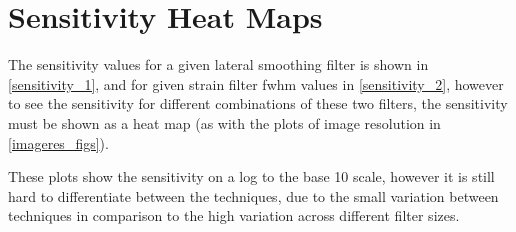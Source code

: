 \chapter{Sensitivity Heat Maps}\label{sensitivity_app}

The sensitivity values for a given lateral smoothing filter is shown in \autoref{sensitivity_1}, and for given strain filter \ac{fwhm} values in \autoref{sensitivity_2}, however to see the sensitivity for different combinations of these two filters, the sensitivity must be shown as a heat map (as with the plots of image resolution in \autoref{imageres_figs}). 

These plots show the sensitivity on a log to the base 10 scale, however it is still hard to differentiate between the techniques, due to the small variation between techniques in comparison to the high variation across different filter sizes.

